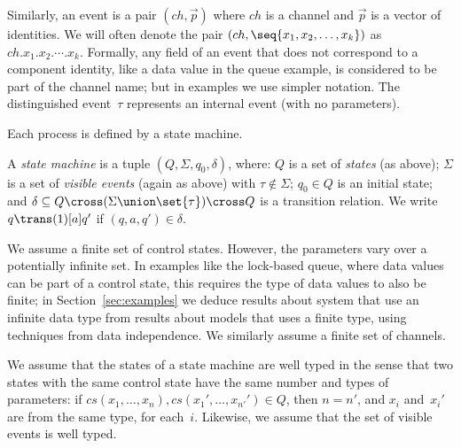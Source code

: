 Similarly, an event is a pair $(ch, \vec p)$ where $ch$ is a channel and
$\vec{p}$ is a vector of identities.  We will often denote the pair
$(ch, \seq{x_1,x_2,\ldots,x_k})$ as $ch.x_1.x_2.\cdots.x_k$.  Formally, any
field of an event that does not correspond to a component identity, like a
data value in the queue example, is considered to be part of the channel name;
but in examples we use simpler notation.  The distinguished event~$\tau$
represents an internal event (with no parameters).

Each process is defined by a state machine.
%
\begin{definition}
\label{def:state-machine}
A \emph{state machine} is a tuple $(Q, \Sigma, q_0, \delta)$, where: $Q$ is a
set of \emph{states} (as above); $\Sigma$ is a set of \emph{visible events}
(again as above) with $\tau \nin \Sigma$; $q_0 \in Q$ is an initial state; and
\( \delta \subseteq Q \cross (\Sigma \union \set{\tau}) \cross Q \) is a
transition relation.
We write $q \trans(1)[a] q'$ if $(q,a,q') \in \delta$.
\end{definition}




We assume a finite set of control states.  However, the parameters vary over a
potentially infinite set.  In examples like the lock-based
queue, where data values can be part of a control state, this requires the
type of data values to also be finite; in Section~\ref{sec:examples} we deduce
results about system that use an infinite data type from results about models
that uses a finite type, using techniques from data independence.  We
similarly assume a finite set of channels.

We assume that the states of a state machine are well typed in the sense that
two states with the same control state have the same number and types of
parameters: if $cs(x_1,\ldots,x_n), cs(x_1',\ldots,x_{n'}') \in Q$, then $n =
n'$, and $x_i$ and~$x_i'$ are from the same type, for each~$i$.  Likewise,
we assume that the set of visible events is well typed.

